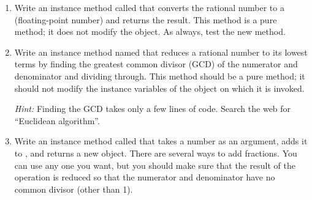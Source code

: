 \begin{exercise}
\begin{enumerate}
\item Write an instance method called  that converts the rational number to a  (floating-point number) and returns the result.
This method is a pure method; it does not modify the object.
As always, test the new method.

\item Write an instance method named  that reduces a rational number to its lowest terms by finding the greatest common divisor (GCD) of the numerator and denominator and dividing through.
This method should be a pure method; it should not modify the instance variables of the object on which it is invoked.

{\em Hint:} Finding the GCD takes only a few lines of code.
Search the web for ``Euclidean algorithm''.

\item Write an instance method called  that takes a  number as an argument, adds it to , and returns a new  object.
There are several ways to add fractions.
You can use any one you want, but you should make sure that the result of the operation is reduced so that the numerator and denominator have no common divisor (other than 1).

\end{enumerate}

\end{exercise}
